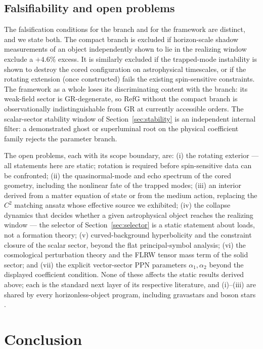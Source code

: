 \documentclass[12pt,a4paper]{article}
\begin{document}
\subsection{Falsifiability and open problems}
\label{sec:open}

The falsification conditions for the branch and for the framework are
distinct, and we state both. The compact branch is excluded if
horizon-scale shadow measurements of an object independently shown to lie in
the realizing window exclude a $+4.6\%$ excess. It is similarly excluded if
the trapped-mode instability is shown to destroy the cored configuration on
astrophysical timescales, or if the rotating extension (once constructed)
fails the existing spin-sensitive constraints. The framework as a whole loses its
discriminating content with the branch: its weak-field sector is
GR-degenerate, so RefG without the compact branch is observationally
indistinguishable from GR at currently accessible orders. The
scalar-sector stability window of
Section~\ref{sec:stability} is an independent internal filter: a
demonstrated ghost or superluminal root on the physical coefficient family
rejects the parameter branch.

The open problems, each with its scope boundary, are: (i) the rotating
exterior --- all statements here are static; rotation is required before
spin-sensitive data can be confronted; (ii) the quasinormal-mode and echo
spectrum of the cored geometry, including the nonlinear fate of the
trapped modes; (iii) an interior derived from a matter equation of state or
from the medium action, replacing the $C^2$ matching ansatz whose effective
source we exhibited; (iv) the collapse dynamics that decides whether a
given astrophysical object reaches the realizing window --- the selector of
Section~\ref{sec:selector} is a static statement about loads, not a
formation theory; (v) curved-background hyperbolicity and the constraint
closure of the scalar sector, beyond the flat principal-symbol analysis;
(vi) the cosmological perturbation theory and the FLRW tensor mass term of
the solid sector; and (vii) the explicit vector-sector PPN parameters
$\alpha_1,\alpha_2$ beyond the displayed coefficient condition. None of
these affects the static results derived above; each is the standard next
layer of its respective literature, and (i)--(iii) are shared by every
horizonless-object program, including gravastars and boson stars
\cite{CardosoPani2019}.

\section{Conclusion}
\label{sec:conclusion}
\end{document}
